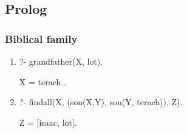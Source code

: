 \documentclass{article}
\begin{document}
	\subsection*{Prolog}
	
	\subsubsection*{Biblical family}
	\begin{enumerate}
	\item ?- grandfather(X, lot).
	
	X = terach .

	\item ?- findall(X, (son(X,Y), son(Y, terach)), Z).
	
	Z = [isaac, lot].

	\end{enumerate}
\end{document}
